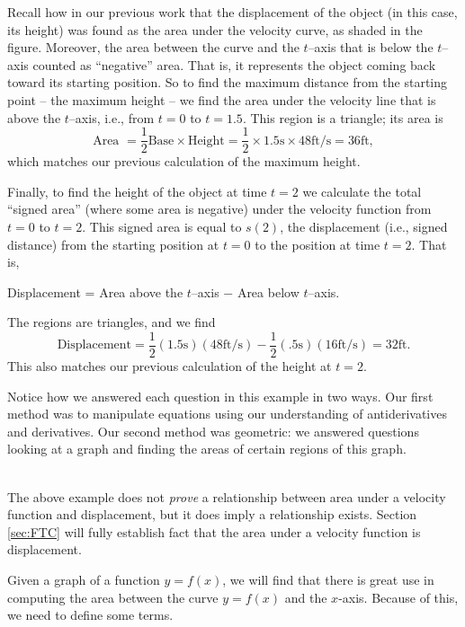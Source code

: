 {Recall how in our previous work that the displacement of the object (in this case, its height) was found as the area under the velocity curve, as shaded in the figure. Moreover, the area between the curve and the $t$--axis that is below the $t$--axis counted as ``negative'' area. That is, it represents the object coming back toward its starting position. So to find the maximum distance from the starting point -- the maximum height -- we find the area under the velocity line that is above the $t$--axis, i.e., from $t=0$ to $t=1.5$. This region is a triangle; its area is 
$$\text{Area } = \frac12\text{Base} \times \text{Height} =\frac12\times 1.5\text{s}\times 48\text{ft/s} = 36\text{ft},$$
which matches our previous calculation of the maximum height.

\enlargethispage{\baselineskip}
\drawexampleline
Finally, to find the height of the object at time $t=2$ we calculate the total ``signed area'' (where some area is negative) under the velocity function from $t=0$ to $t=2$. This signed area is equal to $s(2)$, the displacement (i.e., signed distance) from the starting position at $t=0$ to the position at time $t=2$. That is,
	\begin{center}
	Displacement = Area above the $t$--axis $-$ Area below $t$--axis.
	\end{center}
	The regions are triangles, and we find 
	$$\text{Displacement} = \frac12(1.5\text{s})(48\text{ft/s}) - \frac12(.5\text{s})(16\text{ft/s}) = 32\text{ft}.$$
This also matches our previous calculation of the height at $t=2$.

Notice how we answered each question in this example in two ways. Our first method was to manipulate equations using our understanding of antiderivatives and derivatives. Our second method was geometric: we answered questions looking at a graph and finding the areas of certain regions of this graph.
}\\

The above example does not \textit{prove} a relationship between area under a velocity function and displacement, but it does imply a relationship exists. Section \ref{sec:FTC} will fully establish fact that the area under a velocity function is displacement.

Given a graph of a function $y=f(x)$, we will find that there is great use in computing the area between the curve $y=f(x)$ and the $x$-axis. Because of this, we need to define some terms.

